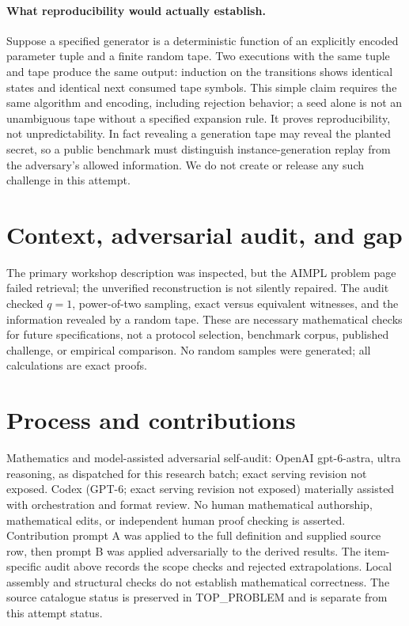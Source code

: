 \documentclass[11pt]{article}
\begin{document}
\paragraph{What reproducibility would actually establish.}
Suppose a specified generator is a deterministic function of an explicitly
encoded parameter tuple and a finite random tape. Two executions with the
same tuple and tape produce the same output: induction on the transitions
shows identical states and identical next consumed tape symbols. This simple
claim requires the same algorithm and encoding, including rejection behavior;
a seed alone is not an unambiguous tape without a specified expansion rule.
It proves reproducibility, not unpredictability. In fact revealing a generation
tape may reveal the planted secret, so a public benchmark must distinguish
instance-generation replay from the adversary's allowed information. We do
not create or release any such challenge in this attempt.

\section{Context, adversarial audit, and gap}
The primary workshop description was inspected, but the AIMPL problem page
failed retrieval; the unverified reconstruction is not silently repaired.
The audit checked $q=1$, power-of-two sampling, exact versus equivalent
witnesses, and the information revealed by a random tape. These are necessary
mathematical checks for future specifications, not a protocol selection,
benchmark corpus, published challenge, or empirical comparison. No random
samples were generated; all calculations are exact proofs.

\section{Process and contributions}
Mathematics and model-assisted adversarial self-audit: OpenAI gpt-6-astra, ultra reasoning, as dispatched for this research batch; exact serving revision not exposed. Codex (GPT-6; exact serving revision not exposed) materially assisted with orchestration and format review. No human mathematical authorship, mathematical edits, or independent human proof checking is asserted.
Contribution prompt A was applied to the full definition and supplied source row, then prompt B was applied adversarially to the derived results. The item-specific audit above records the scope checks and rejected extrapolations. Local assembly and structural checks do not establish mathematical correctness. The source catalogue status is preserved in TOP\_PROBLEM and is separate from this attempt status.
\end{document}
